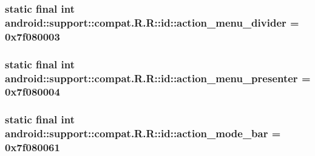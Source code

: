 \hypertarget{classandroid_1_1support_1_1compat_1_1_r_1_1id_22bb60918733fcaecb6995b3ef7bf988}{
\subsubsection[{action\_\-menu\_\-divider}]{\setlength{\rightskip}{0pt plus 5cm}static final int android::support::compat.R.R::id::action\_\-menu\_\-divider = 0x7f080003}}
\label{classandroid_1_1support_1_1compat_1_1_r_1_1id_22bb60918733fcaecb6995b3ef7bf988}


\hypertarget{classandroid_1_1support_1_1compat_1_1_r_1_1id_4a71eefd52f838831177ad1e69e084df}{
\subsubsection[{action\_\-menu\_\-presenter}]{\setlength{\rightskip}{0pt plus 5cm}static final int android::support::compat.R.R::id::action\_\-menu\_\-presenter = 0x7f080004}}
\label{classandroid_1_1support_1_1compat_1_1_r_1_1id_4a71eefd52f838831177ad1e69e084df}


\hypertarget{classandroid_1_1support_1_1compat_1_1_r_1_1id_a5c007f4f5ee1391191c6e7e4fffcf27}{
\subsubsection[{action\_\-mode\_\-bar}]{\setlength{\rightskip}{0pt plus 5cm}static final int android::support::compat.R.R::id::action\_\-mode\_\-bar = 0x7f080061}}
\label{classandroid_1_1support_1_1compat_1_1_r_1_1id_a5c007f4f5ee1391191c6e7e4fffcf27}



